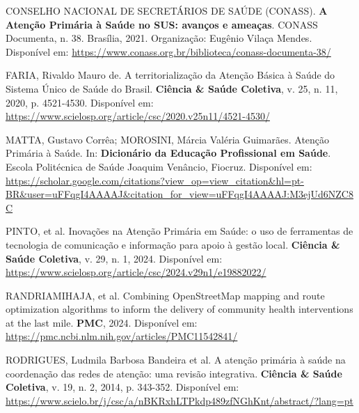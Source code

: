 \documentclass[11pt,a4paper]{article}
\begin{document}
CONSELHO NACIONAL DE SECRETÁRIOS DE SAÚDE (CONASS). \textbf{A Atenção
Primária à Saúde no SUS: avanços e ameaças}. CONASS Documenta, n. 38.
Brasília, 2021. Organização: Eugênio Vilaça Mendes. Disponível em:
\url{https://www.conass.org.br/biblioteca/conass-documenta-38/}

FARIA, Rivaldo Mauro de. A territorialização da Atenção Básica à Saúde
do Sistema Único de Saúde do Brasil. \textbf{Ciência \& Saúde Coletiva},
v. 25, n. 11, 2020, p. 4521-4530. Disponível em:
\url{https://www.scielosp.org/article/csc/2020.v25n11/4521-4530/}

MATTA, Gustavo Corrêa; MOROSINI, Márcia Valéria Guimarães. Atenção
Primária à Saúde. In: \textbf{Dicionário da Educação Profissional em
Saúde}. Escola Politécnica de Saúde Joaquim Venâncio, Fiocruz.
Disponível em:
\url{https://scholar.google.com/citations?view_op=view_citation&hl=pt-BR&user=uFFqgI4AAAAJ&citation_for_view=uFFqgI4AAAAJ:M3ejUd6NZC8C}

PINTO, et al. Inovações na Atenção Primária em Saúde: o uso de
ferramentas de tecnologia de comunicação e informação para apoio à
gestão local. \textbf{Ciência \& Saúde Coletiva}, v. 29, n. 1, 2024.
Disponível em:
\url{https://www.scielosp.org/article/csc/2024.v29n1/e19882022/}

RANDRIAMIHAJA, et al. Combining OpenStreetMap mapping and route
optimization algorithms to inform the delivery of community health
interventions at the last mile. \textbf{PMC}, 2024. Disponível em:
\url{https://pmc.ncbi.nlm.nih.gov/articles/PMC11542841/}

RODRIGUES, Ludmila Barbosa Bandeira et al. A atenção primária à saúde na
coordenação das redes de atenção: uma revisão integrativa.
\textbf{Ciência \& Saúde Coletiva}, v. 19, n. 2, 2014, p. 343-352.
Disponível em:
\url{https://www.scielo.br/j/csc/a/nBKRxhLTPkdp489zfNGhKnt/abstract/?lang=pt}
\end{document}
